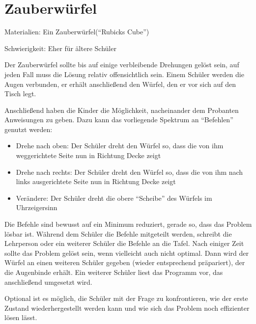 \section{Zauberwürfel}\label{zauberwuxfcrfel}

Materialien: Ein Zauberwürfel(``Rubicks Cube'')

Schwierigkeit: Eher für ältere Schüler

Der Zauberwürfel sollte bis auf einige verbleibende Drehungen gelöst
sein, auf jeden Fall muss die Lösung relativ offensichtlich sein. Einem
Schüler werden die Augen verbunden, er erhält anschließend den Würfel,
den er vor sich auf den Tisch legt.

Anschließend haben die Kinder die Möglichkeit, nacheinander dem
Probanten Anweisungen zu geben. Dazu kann das vorliegende Spektrum an
``Befehlen'' genutzt werden:

\begin{itemize}
\item
  Drehe nach oben: Der Schüler dreht den Würfel so, dass die von ihm
  weggerichtete Seite nun in Richtung Decke zeigt
\item
  Drehe nach rechts: Der Schüler dreht den Würfel so, dass die von ihm
  nach links ausgerichtete Seite nun in Richtung Decke zeigt
\item
  Verändere: Der Schüler dreht die obere ``Scheibe'' des Würfels im
  Uhrzeigersinn
\end{itemize}

Die Befehle sind bewusst auf ein Minimum reduziert, gerade so, dass das
Problem lösbar ist. Während dem Schüler die Befehle mitgeteilt werden,
schreibt die Lehrperson oder ein weiterer Schüler die Befehle an die
Tafel. Nach einiger Zeit sollte das Problem gelöst sein, wenn vielleicht
auch nicht optimal. Dann wird der Würfel an einen weiteren Schüler
gegeben (wieder entsprechend präpariert), der die Augenbinde erhält. Ein
weiterer Schüler liest das Programm vor, das anschließend umgesetzt
wird.

Optional ist es möglich, die Schüler mit der Frage zu konfrontieren, wie
der erste Zustand wiederhergestellt werden kann und wie sich das Problem
noch effizienter lösen lässt.

